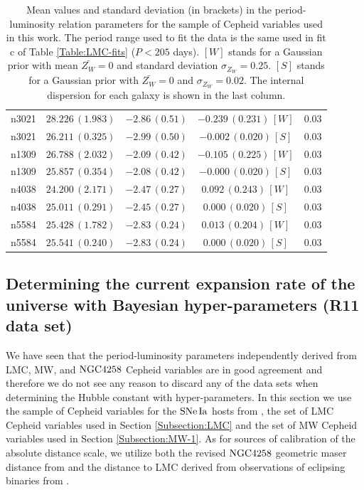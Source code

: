 \begin{table}[tbp]
\begin{tabular}{@{}ccccc}
 n3021 & $28.226\,(1.983)$ & $-2.86\,(0.51)$ & $-0.239\,(0.231)\,[W]$ & $0.03$ \\

 n3021 & $26.211\,(0.325)$ & $-2.99\,(0.50)$ & $-0.002\,(0.020)\,[S]$ & $0.03$ \\
  
 n1309 & $26.788\,(2.032)$ & $-2.09\,(0.42)$ & $-0.105\,(0.225)\,[W]$ & $0.03$ \\

 n1309 & $25.857\,(0.354)$ & $-2.08\,(0.42)$ & $-0.000\,(0.020)\,[S]$ & $0.03$ \\
   
 n4038 & $24.200\,(2.171)$ & $-2.47\,(0.27)$ & $0.092\,(0.243)\,[W]$ & $0.03$ \\

 n4038 & $25.011\,(0.291)$ & $-2.45\,(0.27)$ & $0.000\,(0.020)\,[S]$ & $0.03$ \\
    
 n5584 & $25.428\,(1.782)$ & $-2.83\,(0.24)$ & $0.013\,(0.204)\,[W]$ & $0.03$ \\   

 n5584 & $25.541\,(0.240)$ & $-2.83\,(0.24)$ & $0.000\,(0.020)\,[S]$ & $0.03$ \\   
 
\hline
\end{tabular}
\caption{\label{Table:Zw-dependence-of-PL-relation} Mean values and standard deviation (in brackets) in the period-luminosity relation parameters for the sample of Cepheid variables used in this work. The period range used to fit the data is the same used in fit c of Table \ref{Table:LMC-fits} ($P<205$ days). $[W]$ stands for a Gaussian prior with mean  $\bar{Z_W}=0$ and standard deviation $\sigma_{Z_W}=0.25$. $[S]$ stands for a Gaussian prior with $\bar{Z_W}=0$ and $\sigma_{Z_W}=0.02$. The internal dispersion for each galaxy is shown in the last column.}
\end{table}

\subsection{Determining the current expansion rate of the universe with Bayesian hyper-parameters (R11 data set)}
\label{Subsection:combining-anchors}

We have seen that the period-luminosity parameters independently derived from LMC, MW, and $\mathrm{NGC4258}$ Cepheid variables are in good agreement and therefore we do not see any reason to discard any of the data sets when determining the Hubble constant with hyper-parameters. In this section we use the sample of Cepheid variables for the $\mathrm{SNe\,Ia}$ hosts from \cite{Riess:2011yx}, the set of LMC Cepheid variables used in Section \ref{Subsection:LMC} and the set of MW Cepheid variables used in Section \ref{Subsection:MW-1}. As for sources of calibration of the absolute distance scale, we utilize both the revised $\mathrm{NGC4258}$ geometric maser distance from \cite{Humphreys:2013eja} and the distance to LMC derived from observations of eclipsing binaries from \cite{Pietrzynski:2013gia}.


